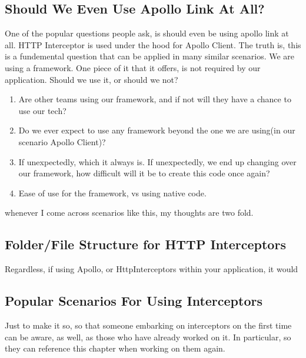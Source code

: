 \subsection{Should We Even Use Apollo Link At All?}
One of the popular questions people ask, is should even be using apollo link at 
all. HTTP Interceptor is used under the hood for Apollo Client. The truth is, 
this is a fundemental question that can be applied in many similar scenarios. 
We are using a framework. One piece of it that it offers, is not required by 
our application. Should we use it, or should we not? 
\begin{enumerate}
  \item Are other teams using our framework, and if not will they have a chance
  to use our tech? 
  \item Do we ever expect to use any framework beyond the one we are using(in 
  our scenario Apollo Client)? 
  \item If unexpectedly, which it always is. If unexpectedly, we end up 
  changing over our framework, how difficult will it be to create this code 
  once again? 
  \item Ease of use for the framework, vs using native code. 
\end{enumerate}
whenever I come across scenarios like this, my thoughts are two fold. 

\subsection{Folder/File Structure for HTTP Interceptors}
Regardless, if using Apollo, or HttpInterceptors within your application, it 
would

\subsection{Popular Scenarios For Using Interceptors}
Just to make it so, so that someone embarking on interceptors on the first 
time can be aware, as well, as those who have already worked on it. In
particular, so they can reference this chapter when working on them again. 

